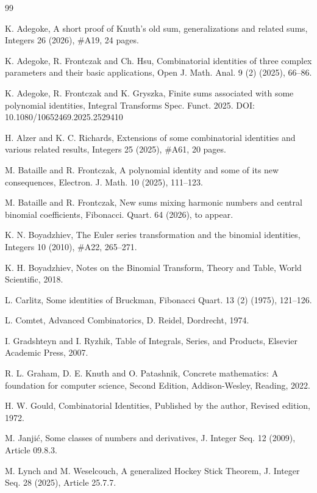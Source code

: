 \documentclass[11pt,reqno]{amsart}
\theoremstyle{plain}
\numberwithin{equation}{section}
\begin{document}
\begin{thebibliography}{99}

K. Adegoke, A short proof of Knuth's old sum, generalizations and related sums, Integers 26 (2026), \#A19, 24 pages.

K. Adegoke, R. Frontczak and Ch. Hsu, Combinatorial identities of three complex parameters and their basic applications, 
Open J. Math. Anal. 9 (2) (2025), 66--86. 

K. Adegoke, R. Frontczak and K. Gryszka, Finite sums associated with some polynomial identities, Integral Transforms Spec. Funct. 2025. 
DOI: 10.1080/10652469.2025.2529410 

H. Alzer and K. C. Richards, Extensions of some combinatorial identities and various related results, Integers 25 (2025), \#A61, 20 pages.

M. Bataille and R. Frontczak, A polynomial identity and some of its new consequences, Electron. J. Math. 10 (2025), 111--123.

M. Bataille and R. Frontczak, New sums mixing harmonic numbers and central binomial coefficients, Fibonacci. Quart. 64 (2026), to appear.

K. N. Boyadzhiev, The Euler series transformation and the binomial identities, Integers 10 (2010), \#A22, 265--271.

K. H. Boyadzhiev, Notes on the Binomial Transform, Theory and Table, World Scientific, 2018.

L. Carlitz, Some identities of Bruckman, Fibonacci Quart. 13 (2) (1975), 121--126.

L. Comtet, Advanced Combinatorics, D. Reidel, Dordrecht, 1974.

I. Gradshteyn and I. Ryzhik, Table of Integrals, Series, and Products, Elsevier Academic Press, 2007.

R. L. Graham, D. E. Knuth and O. Patashnik, Concrete mathematics: A foundation for computer science, Second Edition, Addison-Wesley, Reading, 2022.

H. W. Gould, Combinatorial Identities, Published by the author, Revised edition, 1972.

M. Janji\'{c}, Some classes of numbers and derivatives, J. Integer Seq. 12 (2009), Article 09.8.3.

M. Lynch and M. Weselcouch, A generalized Hockey Stick Theorem, J. Integer Seq. 28 (2025), Article 25.7.7.


\end{thebibliography}
\end{document}

